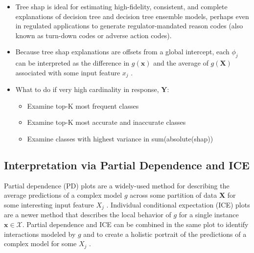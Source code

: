 \documentclass{article}
\begin{document}
\begin{itemize}
	
	\item Tree shap is ideal for estimating high-fidelity, consistent, and complete explanations of decision tree and decision tree ensemble models, perhaps even in regulated applications to generate regulator-mandated reason codes (also known as turn-down codes or adverse action codes).
	
	\item Because tree shap explanations are offsets from a global intercept, each $\phi_j$ can be interpreted as the difference in $g(\mathbf{x})$ and the average of $g(\mathbf{X})$ associated with some input feature $x_j$ \cite{molnar}. 

\item What to do if very high cardinality in response, $\mathbf{Y}$:

\begin{itemize}

  \item Examine top-K most frequent classes
  \item Examine top-K most accurate and inaccurate classes
  \item Examine classes with highest variance in sum(absolute(shap))

\end{itemize}

\end{itemize}


\subsection{Interpretation via Partial Dependence and ICE}

Partial dependence (PD) plots are a widely-used method for describing the average predictions of a complex model $g$ across some partition of data $\mathbf{X}$ for some interesting input feature $X_j$ \cite{esl}. Individual conditional expectation (ICE) plots are a newer method that describes the local behavior of $g$ for a single instance $\mathbf{x} \in \mathcal{X}$. Partial dependence and ICE can be combined in the same plot to identify interactions modeled by $g$ and to create a holistic portrait of the predictions of a complex model for some $X_j$  \cite{ice_plots}.
	
\end{document}
